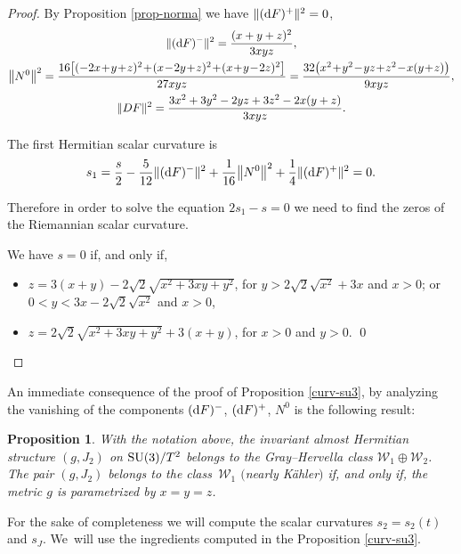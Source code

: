 \documentclass[pdftex]{sigma}%
\numberwithin{equation}{section}
\newtheorem{Proposition}[Theorem]{Proposition}
 { \theoremstyle{definition}
\newtheorem{Definition}[Theorem]{Definition}
\newtheorem{Question}[Theorem]{Question}
\newtheorem*{Notation}{Notation}
\newtheorem{Example}[Theorem]{Example}
\newtheorem{Remark}[Theorem]{Remark} }
\begin{document}
\begin{proof}
By Proposition \ref{prop-norma} we have $\|({\rm d}F)^{+}\|^{2}=0$,
\begin{gather*}
\|({\rm d}F)^{-}\|^{2}=\dfrac{(x+y+z)^{2}}{3xyz},
\\
\big\|N^{0}\big\|^{2}=\dfrac{16\big[(-2x\!+\!y\!+\!z)^{2}\!+\!(x\!-\!2y\!+\!z)^{2}\!+\!(x\!+\!y\!-\!2z)^{2}\big]}{27 xyz}
=\dfrac{32 \big(x^2 \!+\! y^2 \!-\! y z \!+\! z^2 \!-\! x (y \!+\! z)\big)}{9 x y z},
\\
\|DF\|^{2}=\dfrac{3 x^2 + 3 y^2 - 2 y z + 3 z^2 - 2 x (y + z)}{3 x y z}.
\end{gather*}

The first Hermitian scalar curvature is
\begin{gather*}
s_{1}=\dfrac{s}{2}-\dfrac{5}{12}\|({\rm d}F)^{-}\|^{2}+\dfrac{1}{16}\big\|N^{0}\big\|^{2}+\dfrac{1}{4}\|({\rm d}F)^{+}\|^{2}=0.
\end{gather*}

Therefore in order to solve the equation $2s_{1}-s=0$ we need to find the zeros of the Riemannian scalar curvature.

We have $s=0$ if, and only if,
\begin{itemize}\itemsep=0pt
\item[$(i)$] $z=3 (x+y)-2 \sqrt{2} \sqrt{x^2+3 x y+y^2}$, for $y>2 \sqrt{2} \sqrt{x^2}+3 x$ and $x>0$; or
$0<y<3 x-2 \sqrt{2} \sqrt{x^2}$ and $x>0$,
\item[$(ii)$] $z=2 \sqrt{2} \sqrt{x^2+3 x y+y^2}+3 (x+y)$, for $x>0$ and $y>0$.
\hfill \qed
\end{itemize}\renewcommand{\qed}{}
\end{proof}

An immediate consequence of the proof of Proposition \ref{curv-su3}, by analyzing the vanishing of the components $({\rm d}F)^{-}$, $({\rm d}F)^{+}$, $N^0$ is the following result:
\begin{Proposition}\label{prop-c1}
With the notation above, the invariant almost Hermitian structure $(g, J_{2})$ on ${\rm SU}(3)/T^2$ belongs to the Gray--Hervella class $\mathcal{W}_{1}\oplus \mathcal{W}_{2}$. The pair $(g, J_{2})$ belongs to the class~$\mathcal{W}_{1}$ $($nearly K\"ahler$)$ if, and only if, the metric $g$ is parametrized by $x=y=z$.
\end{Proposition}

For the sake of completeness we will compute the scalar curvatures $s_2=s_{2}(t)$ and $s_J$. We~will use the ingredients computed in the Proposition \ref{curv-su3}.
\end{document}
